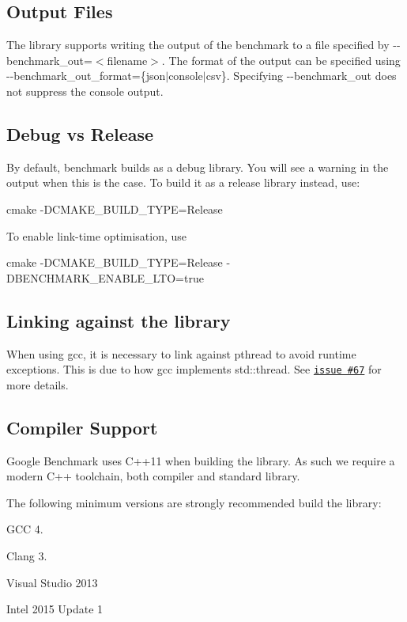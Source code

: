 \subsection*{Output Files}

The library supports writing the output of the benchmark to a file specified by {\ttfamily -\/-\/benchmark\+\_\+out=$<$filename$>$}. The format of the output can be specified using {\ttfamily -\/-\/benchmark\+\_\+out\+\_\+format=\{json$\vert$console$\vert$csv\}}. Specifying {\ttfamily -\/-\/benchmark\+\_\+out} does not suppress the console output.

\subsection*{Debug vs Release}

By default, benchmark builds as a debug library. You will see a warning in the output when this is the case. To build it as a release library instead, use\+:


\begin{DoxyCode}
cmake -DCMAKE\_BUILD\_TYPE=Release
\end{DoxyCode}


To enable link-\/time optimisation, use


\begin{DoxyCode}
cmake -DCMAKE\_BUILD\_TYPE=Release -DBENCHMARK\_ENABLE\_LTO=true
\end{DoxyCode}


\subsection*{Linking against the library}

When using gcc, it is necessary to link against pthread to avoid runtime exceptions. This is due to how gcc implements std\+::thread. See \href{https://github.com/google/benchmark/issues/67}{\tt issue \#67} for more details.

\subsection*{Compiler Support}

Google Benchmark uses C++11 when building the library. As such we require a modern C++ toolchain, both compiler and standard library.

The following minimum versions are strongly recommended build the library\+:


\begin{DoxyItemize}
\item G\+CC 4.
\item Clang 3.
\item Visual Studio 2013
\item Intel 2015 Update 1
\end{DoxyItemize}


